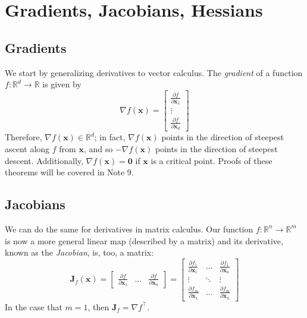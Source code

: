 \documentclass{article}
\begin{document}
\section{Gradients, Jacobians, Hessians}

\subsection{Gradients}
We start by generalizing derivatives to vector calculus. The \textit{gradient} of a function $f: \mathbb{R}^d \rightarrow \mathbb{R}$ is given by $$\nabla f(\mathbf{x}) = \begin{bmatrix} \frac{\partial f}{\partial \mathbf{x}_1} \\ \vdots \\ \frac{\partial f}{\partial \mathbf{x}_d} \end{bmatrix}$$ Therefore, $\nabla f(\mathbf{x}) \in \mathbb{R}^d$; in fact, $\nabla f(\mathbf{x})$ points in the direction of steepest ascent along $f$ from $\mathbf{x}$, and so $-\nabla f(\mathbf{x})$ points in the direction of steepest descent. Additionally, $\nabla f(\mathbf{x}) = \mathbf{0}$ if $\mathbf{x}$ is a critical point. Proofs of these theorems will be covered in Note 9.

\subsection{Jacobians}
We can do the same for derivatives in matrix calculus. Our function $f: \mathbb{R}^n \rightarrow \mathbb{R}^m$ is now a more general linear map (described by a matrix) and its derivative, known as the \textit{Jacobian}, is, too, a matrix: $$\mathbf{J}_f(\mathbf{x}) = \begin{bmatrix} \frac{\partial f}{\partial \mathbf{x}_1} & \hdots & \frac{\partial f}{\partial \mathbf{x}_n} \end{bmatrix} = \begin{bmatrix} \frac{\partial f_1}{\partial \mathbf{x}_1} & \hdots & \frac{\partial f_1}{\partial \mathbf{x}_n} \\ \vdots & \ddots & \vdots \\ \frac{\partial f_m}{\partial \mathbf{x}_1} & \hdots & \frac{\partial f_m}{\partial \mathbf{x}_n} \end{bmatrix}$$ In the case that $m = 1$, then $\mathbf{J}_f = \nabla f^{\top}$.
\end{document}
